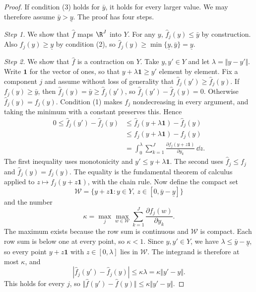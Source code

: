 \begin{proof}
If condition (3) holds for $\bar y$, it holds for every larger value. We may therefore assume $\bar y >
\underline y$. The proof has four steps.

\emph{Step 1.} We show that $\hat f$ maps $\R^J$ into $Y$. For any $y$, $\hat f_j(y) \leq \bar y$ by construction. Also
$f_j(y) \geq \underline y$ by condition (2), so $\hat f_j(y) \geq \min\{\underline y, \bar y\} =
\underline y$.

\emph{Step 2.} We show that $\hat f$ is a contraction on $Y$. Take $y, y' \in Y$ and let $\lambda = \Vert y - y'\Vert$.
Write $\mathbf{1}$ for the vector of ones, so that $y + \lambda\mathbf{1} \geq y'$ element by element. Fix a
component $j$ and assume without loss of generality that $\hat f_j(y') \geq \hat f_j(y)$. If $f_j(y) \geq
\bar y$, then $\hat f_j(y) = \bar y \geq \hat f_j(y')$, so $\hat f_j(y') - \hat f_j(y) = 0$. Otherwise
$\hat f_j(y) = f_j(y)$. Condition (1) makes $f_j$ nondecreasing in every argument, and taking the minimum
with a constant preserves this. Hence
\begin{align*}
  0 \leq \hat f_j(y') - \hat f_j(y)
  &\leq \hat f_j(y + \lambda\mathbf{1}) - \hat f_j(y) \\
  &\leq f_j(y + \lambda\mathbf{1}) - f_j(y) \\
  &= \int_0^{\lambda}\sum_{k=1}^{J}\frac{\partial f_j(y + z\mathbf{1})}{\partial y_k}\, \dd z.
\end{align*}
The first inequality uses monotonicity and $y' \leq y + \lambda\mathbf{1}$. The second uses
$\hat f_j \leq f_j$ and $\hat f_j(y) = f_j(y)$. The equality is the fundamental theorem of calculus applied to
$z \mapsto f_j(y + z\mathbf{1})$, with the chain rule. Now define the compact set
\begin{equation*}
  \mathcal{W} = \{y + z\mathbf{1}: y \in Y,\ z \in [0, \bar y - \underline y]\}
\end{equation*}
and the number
\begin{equation*}
  \kappa = \max_j \max_{w \in \mathcal{W}} \sum_{k=1}^{J}\frac{\partial f_j(w)}{\partial y_k}.
\end{equation*}
The maximum exists because the row sum is continuous and $\mathcal{W}$ is compact. Each row sum is below
one at every point, so $\kappa < 1$. Since $y, y' \in Y$, we have $\lambda \leq \bar y - \underline y$, so
every point $y + z\mathbf{1}$ with $z \in [0, \lambda]$ lies in $\mathcal{W}$. The integrand is therefore at
most $\kappa$, and
\begin{equation*}
  |\hat f_j(y') - \hat f_j(y)| \leq \kappa\lambda = \kappa\Vert y' - y\Vert.
\end{equation*}
This holds for every $j$, so $\Vert \hat f(y') - \hat f(y)\Vert \leq \kappa \Vert y' - y\Vert$.


\end{proof}
